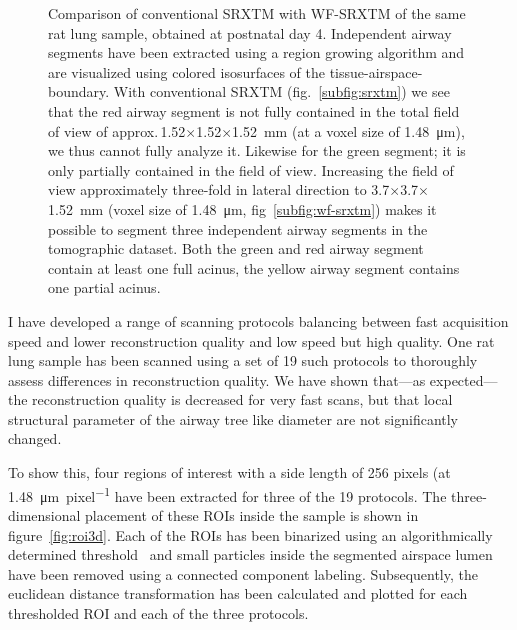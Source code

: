 \documentclass[a4paper,twoside,DIV=calc]{scrartcl}
\newlength\imagescale
\begin{document}
\begin{figure}[htp]
{%
		\label{subfig:wf-srxtm}%
		}%
	\caption{Comparison of conventional SRXTM with WF-SRXTM of the same rat lung sample, obtained at postnatal day 4. Independent airway segments have been extracted using a region growing algorithm and are visualized using colored isosurfaces of the tissue-airspace-boundary. With conventional SRXTM (fig.~\ref{subfig:srxtm}) we see that the red airway segment is not fully contained in the total field of view of approx.\,1.52$\times$1.52$\times$\SI{1.52}{\milli\meter} (at a voxel size of \SI{1.48}{\micro\meter}), we thus cannot fully analyze it. Likewise for the green segment; it is only partially contained in the field of view. Increasing the field of view approximately three-fold in lateral direction to 3.7$\times$3.7$\times$\SI{1.52}{\milli\meter} %
(voxel size of \SI{1.48}{\micro\meter}, fig~\ref{subfig:wf-srxtm}) makes it possible to segment three independent airway segments in the tomographic dataset. Both the green and red airway segment contain at least one full acinus, the yellow airway segment contains one partial acinus.%
}%
\label{fig:wfs-overview}%
\end{figure}

I have developed a range of scanning protocols balancing between fast acquisition speed and lower reconstruction quality and low speed but high quality. One rat lung sample has been scanned using a set of 19 such protocols to thoroughly assess differences in reconstruction quality. We have shown that---as expected---the reconstruction quality is decreased for very fast scans, but that local structural parameter of the airway tree like diameter are not significantly changed.

To show this, four regions of interest with a side length of 256 pixels (at \SI{1.48}{\micro\meter\per pixel} have been extracted for three of the 19 protocols. The three-dimensional placement of these ROIs inside the sample is shown in figure~\ref{fig:roi3d}. Each of the ROIs has been binarized using an algorithmically determined threshold~\cite{Otsu1979} and small particles inside the segmented airspace lumen have been removed using a connected component labeling. Subsequently, the euclidean distance transformation has been calculated and plotted for each thresholded ROI and each of the three protocols.
\end{document}
